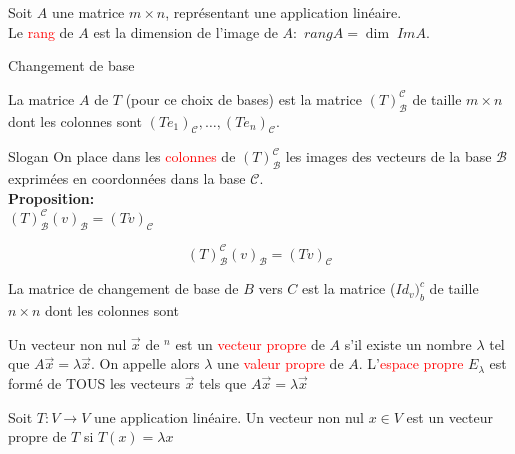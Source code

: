 \begin{definition}
Soit $A$ une matrice $m \times n$, représentant une application linéaire.
\\
    Le \textcolor{red}{rang} de $A$ est la dimension de l'image de $A: $ $rangA = \dim\; ImA$.
\end{definition}
\begin{parag}{Changement de base}
    
\begin{definition}
        La matrice $A$ de $T$ (pour ce choix de bases) est la matrice $\left(T\right)_{\mathcal{B}}^{\mathcal{C}}$ de taille $m \times n$ dont les colonnes sont $\left(Te_1\right)_{\mathcal{C}}, \dots, \left(Te_n\right)_{\mathcal{C}}$.
    \end{definition}
    \begin{subparag}{Slogan}
        On place dans les \textcolor{red}{colonnes} de $\left(T\right)_{\mathcal{B}}^{\mathcal{C}}$ les images des vecteurs de la base $\mathcal{B}$ exprimées en coordonnées dans la base $\mathcal{C}$.
        \\
        \textbf{Proposition:} \\
        $\left(T\right)_{\mathcal{B}}^{\mathcal{C}}\left(v\right)_{\mathcal{B}} = \left(Tv\right)_{\mathcal{C}}$
    \end{subparag}
\end{parag}
        \begin{theoreme}
        \[\left(T\right)_{\mathcal{B}}^{\mathcal{C}}\left(v\right)_{\mathcal{B}} = \left(Tv\right)_{\mathcal{C}}\]
        \end{theoreme}
\begin{definition}
    La matrice de changement de base de $B$ vers $C$ est la matrice ($Id_v)_b^c$ de taille $n \times n$ dont les colonnes sont 
\end{definition}
    \begin{definition}
        Un vecteur non nul $\vec{x}$ de \R$^n$ est un \textcolor{red}{vecteur propre} de $A$ s'il existe un nombre $\lambda$ tel que $A\vec{x} = \lambda \vec{x}$. On appelle alors $\lambda$ une \textcolor{red}{valeur propre} de $A$. L'\textcolor{red}{espace propre} $E_\lambda$ est formé de TOUS les vecteurs $\vec{x}$ tels que $A\vec{x} = \lambda\vec{x}$
    \end{definition}
    \begin{definition}
        Soit $T : V \to V$ une application linéaire. Un vecteur non nul $x \in V$ est un vecteur propre de $T$ si $T(x) = \lambda x$
    \end{definition}
